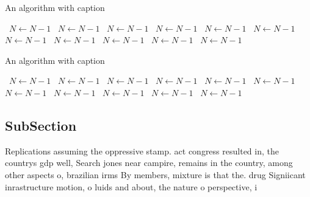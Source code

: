 \documentclass[a4paper]{article}
\begin{document}
\begin{algorithm}
\caption{An algorithm with caption}
\begin{algorithmic}
\    \State $N \gets N - 1$
\    \State $N \gets N - 1$
\    \State $N \gets N - 1$
\    \State $N \gets N - 1$
\    \State $N \gets N - 1$
\    \State $N \gets N - 1$
\    \State $N \gets N - 1$
\    \State $N \gets N - 1$
\    \State $N \gets N - 1$
\    \State $N \gets N - 1$
\    \State $N \gets N - 1$
\EndWhile
\end{algorithmic}
\end{algorithm}

\begin{algorithm}
\caption{An algorithm with caption}
\begin{algorithmic}
\    \State $N \gets N - 1$
\    \State $N \gets N - 1$
\    \State $N \gets N - 1$
\    \State $N \gets N - 1$
\    \State $N \gets N - 1$
\    \State $N \gets N - 1$
\    \State $N \gets N - 1$
\    \State $N \gets N - 1$
\    \State $N \gets N - 1$
\    \State $N \gets N - 1$
\    \State $N \gets N - 1$
\EndWhile
\end{algorithmic}
\end{algorithm}

\subsection{SubSection}

Replications assuming the oppressive stamp. act congress resulted in, the countrys gdp well, Search jones near campire, remains in the country, among other aspects o, brazilian irms By members, mixture is that the. drug Signiicant inrastructure motion, o luids and about, the nature o perspective, i
\end{document}
